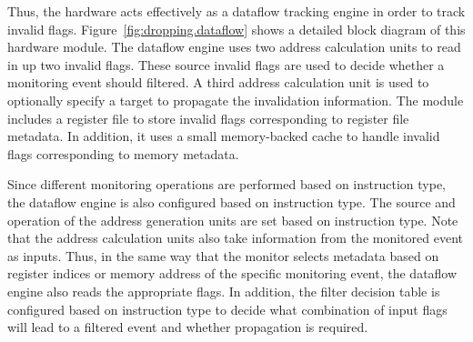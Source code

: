 Thus, the hardware acts effectively as a dataflow tracking engine in order to
track invalid flags. Figure~\ref{fig:dropping.dataflow} shows a detailed block
diagram of this hardware module. The dataflow engine uses two address
calculation units to read in up two invalid flags. These source invalid flags
are used to decide whether a monitoring event should filtered. A third address
calculation unit is used to optionally specify a target to propagate the
invalidation information. The module includes a register file to store invalid
flags corresponding to register file metadata. In addition, it uses a small
memory-backed cache to handle invalid flags corresponding to memory metadata.

Since different monitoring operations are performed based on instruction type,
the dataflow engine is also configured based on instruction type. The source
and operation of the address generation units are set based on instruction
type. Note that the address calculation units also take information from the
monitored event as inputs. Thus, in the same way that the monitor selects
metadata based on register indices or memory address of the specific monitoring
event, the dataflow engine also reads the appropriate flags. In addition, the
filter decision table is configured based on instruction type to decide what
combination of input flags will lead to a filtered event and whether
propagation is required.




